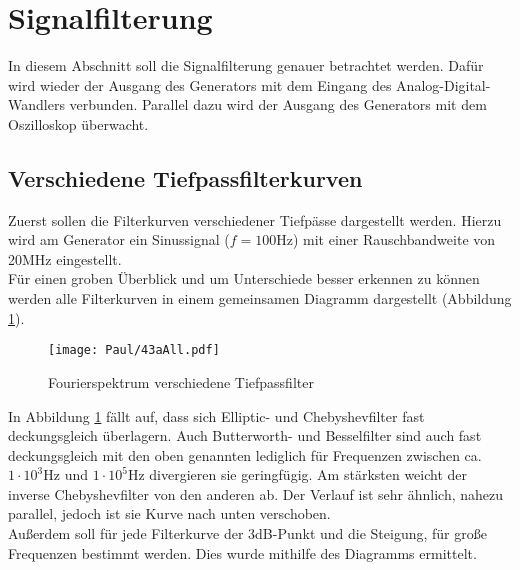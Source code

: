 \section{Signalfilterung}
In diesem Abschnitt soll die Signalfilterung genauer betrachtet werden. Dafür wird wieder der Ausgang des Generators mit dem Eingang des Analog-Digital-Wandlers verbunden. Parallel dazu wird der Ausgang des Generators mit dem Oszilloskop überwacht.

\subsection{Verschiedene Tiefpassfilterkurven}
\label{sec:VerTi}
Zuerst sollen die Filterkurven verschiedener Tiefpässe dargestellt werden. Hierzu wird am Generator ein Sinussignal ($f=100$Hz) mit einer Rauschbandweite von 20MHz eingestellt.\\

Für einen groben Überblick und um Unterschiede besser erkennen zu können werden alle Filterkurven in einem gemeinsamen Diagramm dargestellt (Abbildung \ref{fig:43aAll}). \\

\begin{figure}[h]
    \centering
    \texttt{[image: Paul/43aAll.pdf]}
    \caption{Fourierspektrum verschiedene Tiefpassfilter}
    \label{fig:43aAll}
\end{figure}

In Abbildung \ref{fig:43aAll} fällt auf, dass sich Elliptic- und Chebyshevfilter fast deckungsgleich überlagern. Auch Butterworth- und Besselfilter sind auch fast deckungsgleich mit den oben genannten lediglich für Frequenzen zwischen ca. $1\cdot 10^3$Hz und $1\cdot 10^5$Hz divergieren sie geringfügig. Am stärksten weicht der inverse Chebyshevfilter von den anderen ab. Der Verlauf ist sehr ähnlich, nahezu parallel, jedoch ist sie Kurve nach unten verschoben. \\

\newpage
Außerdem soll  für jede Filterkurve der 3dB-Punkt und die Steigung, für große Frequenzen bestimmt werden.
Dies wurde mithilfe des Diagramms ermittelt.

